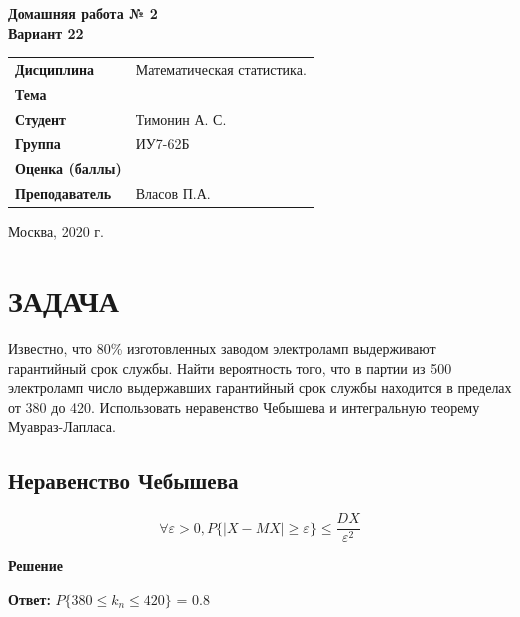 \documentclass[12pt, a4paper]{report}
\begin{document}
\begin{titlepage}
  	\vspace{2cm}
  	
  	\begin{center}
  		\textbf{Домашняя работа № 2} \\
  		\vspace{0.5cm}
  		\textbf{Вариант 22}
  	\end{center}
  	
  	\vspace{4cm}
  	
  	\begin{flushleft}
  		\begin{tabular}{ll}
  			\textbf{Дисциплина} & Математическая статистика. \\
  			\textbf{Тема} & \\
  			\textbf{Студент} & Тимонин А. С. \\
  			\textbf{Группа} & ИУ7-62Б \\
  			\textbf{Оценка (баллы)} & \\
  			\textbf{Преподаватель} & Власов П.А. \\
  		\end{tabular}
  	\end{flushleft}
  	
  	\vspace{6cm}
  	
  	\begin{center}
  		Москва, 2020 г.
  	\end{center}
  	
  	
  \end{titlepage}
  
	
	\section{ЗАДАЧА}
	
	\hspace{1cm} Известно, что 80\% изготовленных заводом электроламп выдерживают гарантийный срок службы. Найти вероятность того, что в партии из 500 электроламп число выдержавших гарантийный срок службы находится в пределах от 380 до 420. Использовать неравенство Чебышева и интегральную теорему Муавраз-Лапласа.
	
	\subsection{Неравенство Чебышева}
	
	\begin{equation*}
	\forall \varepsilon > 0, P\{ |X - MX| \geq \varepsilon \} \le \frac{DX}{\varepsilon^2}
	\end{equation*}
	
	
	
	\textbf{Решение}
	
	\vspace{0.5cm}
	\textbf{Ответ:}
	$P \{ 380 \le k_n \le 420 \}$ = 0.8
	
	\newpage
	
\end{document}

